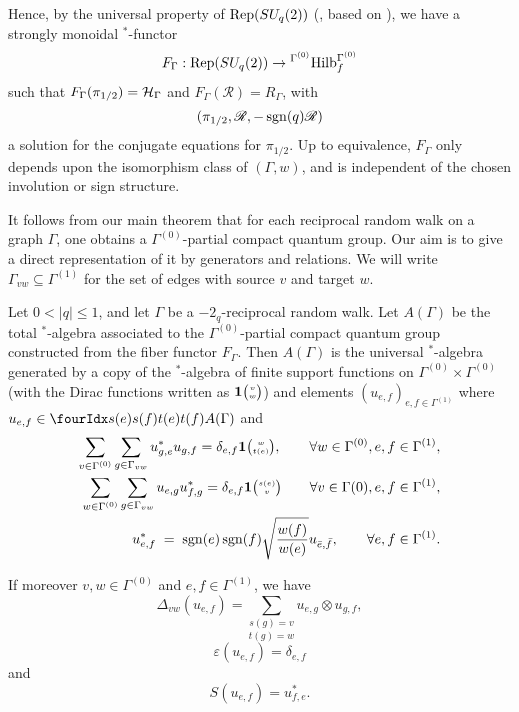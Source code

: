 

Hence, by the universal property of $\mathrm{Rep}(SU_q(2))$ (\cite[Theorem 1.4]{DCY1}, based on \cite{Tur1,Eti1,Yam1,Pin2,Pin3}), we have a strongly monoidal $^*$-functor
\[F_{\Gamma}: \mathrm{Rep}(SU_q(2)) \rightarrow {}^{\Gamma^{(0)}}\mathrm{Hilb}_f^{\Gamma^{(0)}}\] such that $F_{\Gamma}(\pi_{1/2}) = \mathcal{H}_{\Gamma}$ and $F_{\Gamma}(\mathscr{R}) = R_{\Gamma}$, with \[(\pi_{1/2},\mathscr{R},-\operatorname{\mathrm{sgn}}(q)\mathscr{R})\] a solution for the conjugate equations for $\pi_{1/2}$. Up to equivalence, $F_{\Gamma}$ only depends upon the isomorphism class of $(\Gamma,w)$, and is independent of the chosen involution or sign structure.

It follows from our main theorem that for each reciprocal random walk on a graph $\Gamma$, one obtains a $\Gamma^{(0)}$-partial compact quantum group. Our aim is to give a direct representation of it by generators and relations. We will write $\Gamma_{vw}\subseteq \Gamma^{(1)}$ for the set of edges with source $v$ and target $w$.

\begin{Theorem}\label{TheoGenRel} Let $0<|q|\leq 1$, and let $\Gamma$ be a $-2_q$-reciprocal random walk. Let $A(\Gamma)$ be the total $^*$-algebra associated to the $\Gamma^{(0)}$-partial compact quantum group constructed from the fiber functor $F_{\Gamma}$. Then $A(\Gamma)$ is the universal $^*$-algebra generated by a copy of the $^*$-algebra of finite support functions on $\Gamma^{(0)}\times \Gamma^{(0)}$ (with the Dirac functions written as $\mathbf{1}{\tiny {\begin{pmatrix} v\\w\end{pmatrix}}}$) and elements $(u_{e,f})_{e,f\in \Gamma^{(1)}}$ where $u_{e,f}\in \Gr{A(\Gamma)}{s(e)}{t(e)}{s(f)}{t(f)}$ and 
\begin{eqnarray} 
\label{EqUni1}\sum_{v\in \Gamma^{(0)}}\sum_{g\in \Gamma_{vw}} u_{g,e}^*u_{g,f} = \delta_{e,f}\mathbf{1}{\tiny \begin{pmatrix} w \\ t(e)\end{pmatrix}}, \qquad \forall w\in \Gamma^{(0)}, e,f\in \Gamma^{(1)},\\
\label{EqUni2}\sum_{w\in \Gamma^{(0)}} \sum_{g\in \Gamma_{vw}} u_{e,g}u_{f,g}^* = \delta_{e,f} \mathbf{1}{\tiny \begin{pmatrix} s(e) \\ v\end{pmatrix}}\qquad \forall v\in \Gamma{(0)}, e,f\in \Gamma^{(1)},\\ 
\label{EqInt}u_{e,f}^* \;=\; \operatorname{\mathrm{sgn}}(e)\operatorname{\mathrm{sgn}}(f)\sqrt{\frac{w(f)}{w(e)}} u_{\bar{e},\bar{f}},\qquad \forall e,f\in \Gamma^{(1)}.
\end{eqnarray}

If moreover $v,w\in \Gamma^{(0)}$ and $e,f\in \Gamma^{(1)}$, we have \[\Delta_{vw}(u_{e,f}) = \underset{t(g) = w}{\sum_{s(g) = v}} u_{e,g}\otimes u_{g,f},\]
\[\varepsilon(u_{e,f}) = \delta_{e,f}\] and \[S(u_{e,f}) = u_{f,e}^*.\] 
\end{Theorem} 

